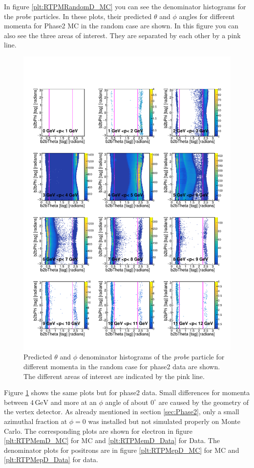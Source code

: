 \documentclass[a4paper,11pt,twosided,final,german,openbib,pdftex,listof=totoc,bibliography=totoc]{scrbook}
\begin{document}
In figure \ref{plt:RTPMRandomD_MC} you can see the denominator histograms for the \textit{probe} particles. In these plots, their predicted $\theta$ and $\phi$ angles for different momenta for Phase2 MC in the random case are shown. In this figure you can also see the three areas of interest. They are separated by each other by a pink line.

\begin{figure}[h!]
	\includegraphics[width=\textwidth]{Plots/RTPMRandomD_Data.pdf}
	\caption[Denominator $\theta$, $\phi$ Random Momentum Data]{Predicted $\theta$ and $\phi$ denominator histograms of the \textit{probe} particle for different momenta in the random case for phase2 data are shown. The different areas of interest are indicated by the pink line.}
	\label{plt:RTPMRandomD_Data}
\end{figure}


 Figure \ref{plt:RTPMRandomD_Data} shows the same plots but for phase2 data. Small differences for momenta between $4\,\textrm{GeV}$ and more at an $\phi$ angle of about $0^\circ$ are caused by the geometry of the vertex detector. As already mentioned in section \ref{sec:Phase2}, only a small azimuthal fraction at $\phi =0$ was installed but not simulated properly on Monte Carlo. 
 The corresponding plots are shown for electron in figure \ref{plt:RTPMemD_MC} for MC and \ref{plt:RTPMemD_Data} for Data. The denominator plots for positrons are in figure \ref{plt:RTPMepD_MC} for MC and \ref{plt:RTPMepD_Data} for data.  
\end{document}
